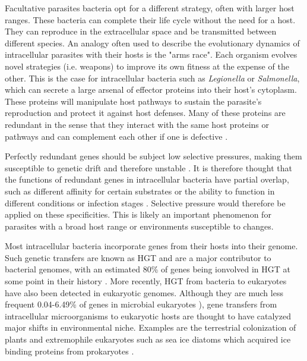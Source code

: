 Facultative parasites bacteria opt for a different strategy, often with larger host ranges. These bacteria can complete their life cycle without the need for a host. They can reproduce in the extracellular space and be transmitted between different species. An analogy often used to describe the evolutionary dynamics of intracellular parasites with their hosts is the "arms race". Each organism evolves novel strategies (i.e. weapons) to improve its own fitness at the expense of the other. This is the case for intracellular bacteria such as \textit{Legionella} or \textit{Salmonella}, which can secrete a large arsenal of effector proteins into their host's cytoplasm. These proteins will manipulate host pathways to sustain the parasite's reproduction and protect it against host defenses. Many of these proteins are redundant in the sense that they interact with the same host proteins or pathways and can complement each other if one is defective \cite{ghoshParalogsMultipleLayers2017}.

Perfectly redundant genes should be subject low selective pressures, making them susceptible to genetic drift and therefore unstable \cite{bergthorssonOhnoDilemmaEvolution2007}. It is therefore thought that the functions of redundant genes in intracellular bacteria have partial overlap, such as different affinity for certain substrates or the ability to function in different conditions or infection stages \cite{ghoshParalogsMultipleLayers2017}. Selective pressure would therefore be applied on these specificities. This is likely an important phenomenon for parasites with a broad host range or environments susceptible to changes.

Most intracellular bacteria incorporate genes from their hosts into their genome. Such genetic transfers are known as \acrfull{HGT} and are a major contributor to bacterial genomes, with an estimated 80\% of genes being ionvolved in HGT at some point in their history \cite{daganModularNetworksCumulative2008}. More recently, HGT from bacteria to eukaryotes have also been detected in eukaryotic genomes. Although they are much less frequent 0.04-6.49\% of genes in microbial eukaryotes \cite{vanettenHorizontalGeneTransfer2020}), gene transfers from intracellular microorganisms to eukaryotic hosts are thought to have catalyzed major shifts in environmental niche. Examples are the terrestrial colonization of plants and extremophile eukaryotes such as sea ice diatoms which acquired ice binding proteins from prokaryotes \cite{vanettenHorizontalGeneTransfer2020}.

